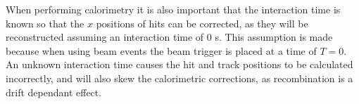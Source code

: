 When performing calorimetry it is also important that the interaction time is known so that the $x$ positions of hits can be corrected, as they will be reconstructed assuming an interaction time of 0 s. This assumption is made because when using beam events the beam trigger is placed at a time of $T = 0$. An unknown interaction time causes the hit and track positions to be calculated incorrectly, and will also skew the calorimetric corrections, as recombination is a drift dependant effect.

